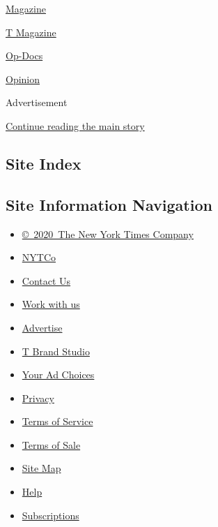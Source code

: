 \href{/video/magazine}{Magazine}

\href{/video/t-magazine}{T Magazine}

\href{/video/op-docs}{Op-Docs}

\href{/video/opinion}{Opinion}

Advertisement

\protect\hyperlink{after-bottom}{Continue reading the main story}

\hypertarget{site-index}{%
\subsection{Site Index}\label{site-index}}

\hypertarget{site-information-navigation}{%
\subsection{Site Information
Navigation}\label{site-information-navigation}}

\begin{itemize}
\tightlist
\item
  \href{https://help.nytimes.com/hc/en-us/articles/115014792127-Copyright-notice}{©~2020~The
  New York Times Company}
\end{itemize}

\begin{itemize}
\tightlist
\item
  \href{https://www.nytco.com/}{NYTCo}
\item
  \href{https://help.nytimes.com/hc/en-us/articles/115015385887-Contact-Us}{Contact
  Us}
\item
  \href{https://www.nytco.com/careers/}{Work with us}
\item
  \href{https://nytmediakit.com/}{Advertise}
\item
  \href{http://www.tbrandstudio.com/}{T Brand Studio}
\item
  \href{https://www.nytimes.com/privacy/cookie-policy\#how-do-i-manage-trackers}{Your
  Ad Choices}
\item
  \href{https://www.nytimes.com/privacy}{Privacy}
\item
  \href{https://help.nytimes.com/hc/en-us/articles/115014893428-Terms-of-service}{Terms
  of Service}
\item
  \href{https://help.nytimes.com/hc/en-us/articles/115014893968-Terms-of-sale}{Terms
  of Sale}
\item
  \href{https://spiderbites.nytimes.com}{Site Map}
\item
  \href{https://help.nytimes.com/hc/en-us}{Help}
\item
  \href{https://www.nytimes.com/subscription?campaignId=37WXW}{Subscriptions}
\end{itemize}
